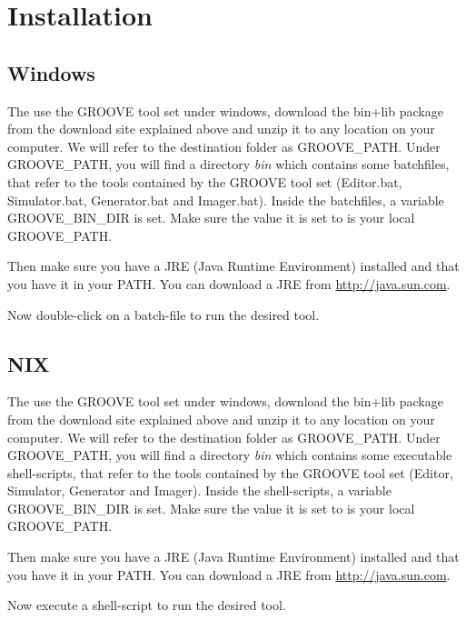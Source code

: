 \section{Installation}

\subsection{Windows}

The use the GROOVE tool set under windows, download the bin+lib package from the download site explained above and unzip it to any location on your computer. We will refer to the destination folder as GROOVE_PATH. Under GROOVE_PATH, you will find a directory \emph{bin} which contains some batchfiles, that refer to the tools contained by the GROOVE tool set (Editor.bat, Simulator.bat, Generator.bat and Imager.bat). Inside the batchfiles, a variable GROOVE_BIN_DIR is set. Make sure the value it is set to is your local GROOVE_PATH.

Then make sure you have a JRE (Java Runtime Environment) installed and that you have it in your PATH. You can download a JRE from \url{http://java.sun.com}.

Now double-click on a batch-file to run the desired tool.

\subsection{NIX}

The use the GROOVE tool set under windows, download the bin+lib package from the download site explained above and unzip it to any location on your computer. We will refer to the destination folder as GROOVE_PATH. Under GROOVE_PATH, you will find a directory \emph{bin} which contains some executable shell-scripts, that refer to the tools contained by the GROOVE tool set (Editor, Simulator, Generator and Imager). Inside the shell-scripts, a variable GROOVE_BIN_DIR is set. Make sure the value it is set to is your local GROOVE_PATH.

Then make sure you have a JRE (Java Runtime Environment) installed and that you have it in your PATH. You can download a JRE from \url{http://java.sun.com}.

Now execute a shell-script to run the desired tool.
